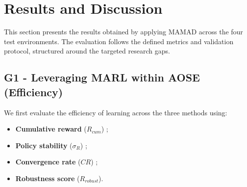 \documentclass[pdflatex,sn-mathphys-num]{sn-jnl}%
\theoremstyle{thmstyleone}%
\theoremstyle{thmstyletwo}%
\theoremstyle{thmstylethree}%
\begin{document}
\section{Results and Discussion} \label{sec:results}

This section presents the results obtained by applying MAMAD across the four test environments. The evaluation follows the defined metrics and validation protocol, structured around the targeted research gaps.

\subsection{G1 - Leveraging MARL within AOSE (Efficiency)}

We first evaluate the efficiency of learning across the three methods using:

\begin{itemize}
    \item \textbf{Cumulative reward} ($R_{cum}$) ;
    \item \textbf{Policy stability} ($\sigma_R$) ;
    \item \textbf{Convergence rate} ($CR$) ;
    \item \textbf{Robustness score} ($R_{robust}$).
\end{itemize}
\end{document}

